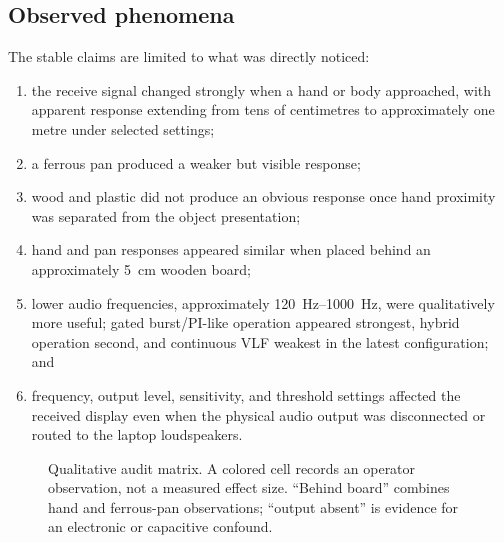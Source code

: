 \documentclass[10pt]{article}
\begin{document}
\subsection{Observed phenomena}
The stable claims are limited to what was directly noticed:
\begin{enumerate}
  \item the receive signal changed strongly when a hand or body approached, with apparent response extending from tens of centimetres to approximately one metre under selected settings;
  \item a ferrous pan produced a weaker but visible response;
  \item wood and plastic did not produce an obvious response once hand proximity was separated from the object presentation;
  \item hand and pan responses appeared similar when placed behind an approximately \SI{5}{\centi\metre} wooden board;
  \item lower audio frequencies, approximately \SIrange{120}{1000}{\hertz}, were qualitatively more useful; gated burst/PI-like operation appeared strongest, hybrid operation second, and continuous VLF weakest in the latest configuration; and
  \item frequency, output level, sensitivity, and threshold settings affected the received display even when the physical audio output was disconnected or routed to the laptop loudspeakers.
\end{enumerate}

\begin{figure}[t]
\centering
{}
\caption{Qualitative audit matrix. A colored cell records an operator observation, not a measured effect size. ``Behind board'' combines hand and ferrous-pan observations; ``output absent'' is evidence for an electronic or capacitive confound.}
\label{fig:audit}
\end{figure}
\end{document}
